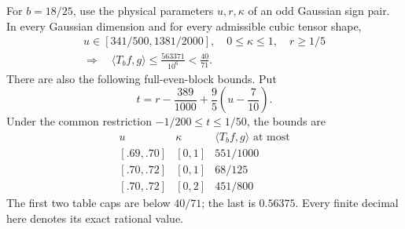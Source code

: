 \begin{proposition}
\label{prop:r3-additional-source-regions}
For $b=18/25$, use the physical parameters $u,r,\kappa$ of an odd
Gaussian sign pair.  In every Gaussian dimension and for every
admissible cubic tensor shape,
\begin{gather*}
 u\in[341/500,1381/2000],\quad 0\leq\kappa\leq1,
 \quad r\geq1/5\\
 \Longrightarrow\quad
 \langle T_bf,g\rangle\leq\frac{563371}{10^6}<\frac{40}{71}.
\end{gather*}
There are also the following full-even-block bounds.  Put
\[
 t=r-\frac{389}{1000}+\frac95\left(u-\frac7{10}\right).
\]
Under the common restriction $-1/200\leq t\leq1/50$, the bounds are
\[
\begin{array}{c|c|c}
 u&\kappa&\langle T_bf,g\rangle\text{ at most}\\\hline
 {[.69,.70]}&[0,1]&551/1000\\
 {[.70,.72]}&[0,1]&68/125\\
 {[.70,.72]}&[0,2]&451/800
\end{array}
\]
The first two table caps are below $40/71$; the last is $0.56375$.
Every finite decimal here denotes its exact rational value.
\end{proposition}
